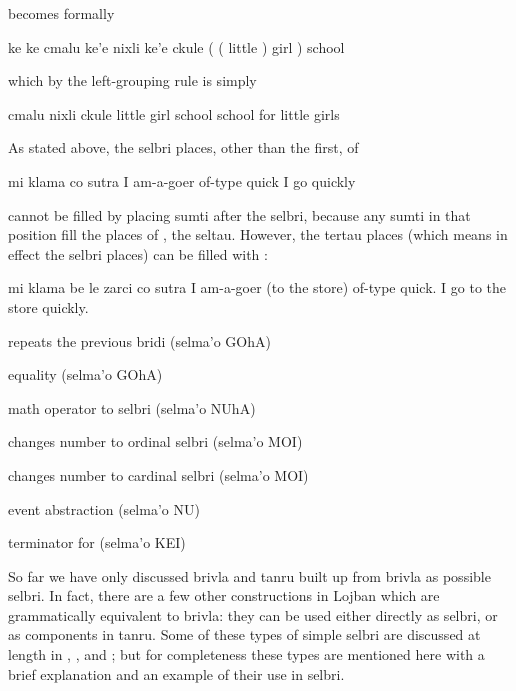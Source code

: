 {\noindent}becomes formally
\begin{example}
ke ke cmalu ke'e nixli ke'e ckule\n
( ( little ) girl ) school
\end{example}

{\noindent}which by the left-grouping rule is simply
\begin{example}
cmalu nixli ckule\n
little girl school\n
school for little girls
\end{example}

As stated above, the selbri places, other than the first,
    of
\begin{example}
mi klama co sutra\n
I am-a-goer of-type quick\n
I go quickly
\end{example}

{\noindent}cannot be filled by placing sumti after the selbri, because any
    sumti in that position fill the places of , the
    seltau. However, the tertau places (which means in effect the
    selbri places) can be filled with :
\begin{example}
mi klama be le zarci co sutra\n
I am-a-goer (to the store) of-type quick.\n
I go to the store quickly.
\end{example}



\begin{description}
\item[go'i] repeats the previous bridi (selma'o GOhA)
\item[du] equality (selma'o GOhA)
\item[nu'a] math operator to selbri (selma'o NUhA)
\item[moi] changes number to ordinal selbri (selma'o MOI)
\item[mei] changes number to cardinal selbri (selma'o MOI)
\item[nu] event abstraction (selma'o NU)
\item[kei] terminator for  (selma'o KEI)
\end{description}
    So far we have only discussed brivla and tanru built up from
    brivla as possible selbri. In fact, there are a few other
    constructions in Lojban which are grammatically equivalent to
    brivla: they can be used either directly as selbri, or as
    components in tanru. Some of these types of simple selbri are
    discussed at length in , , and ; but for completeness these
    types are mentioned here with a brief explanation and an
    example of their use in selbri. 

